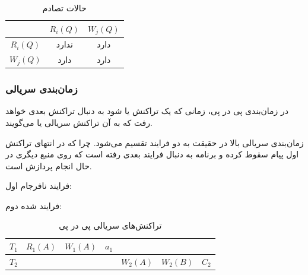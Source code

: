 \documentclass[a4paper]{article}
\begin{document}
\begin{LTR}
    \begin{table}[h]
        \centering
        \begin{RTL}
            \caption{حالات تصادم}
        \end{RTL}
        \begin{tabular}{|c|c|c|}
            \hline
            & $R_{i}(Q)$ & $W_{j}(Q)$ \\ \hline
            $R_{i}(Q)$ & ندارد &  دارد  \\ \hline
            $W_{j}(Q)$ & دارد & دارد  \\ \hline
        \end{tabular}
    \end{table}
\end{LTR}

\subsubsection{زمان‌بندی سریالی}

در زمان‌بندی پی در پی، زمانی که یک تراکنش  یا  شود به دنبال
تراکنش بعدی خواهد رفت که به آن تراکنش سریالی یا 
می‌گویند.

\begin{LTR}
\end{LTR}

زمان‌بندی سریالی بالا در حقیقت به دو فرایند تقسیم می‌شود. چرا که در انتهای
تراکنش اول پیام سقوط کرده و برنامه به دنبال فرایند بعدی رفته است که روی منبع
دیگری در حال انجام پردازش است.

فرایند نافرجام اول:

\begin{LTR}
\end{LTR}

فرایند  شده دوم:

\begin{LTR}
\end{LTR}

\begin{LTR}
    \begin{table}[h]
        \centering
        \begin{RTL}
            \caption{تراکنش‌های سریالی پی در پی}
        \end{RTL}
        \begin{tabular}{|c|c|c|c|c|c|c|}
            \hline
            $T_{1}$ & $R_{1}(A)$ & $W_{1}(A)$ & $a_{1}$ & & & \\ \hline
            $T_{2}$ & & & & $W_{2}(A)$ & $W_{2}(B)$ & $C_{2}$ \\ \hline
        \end{tabular}
    \end{table}
\end{LTR}
\end{document}
